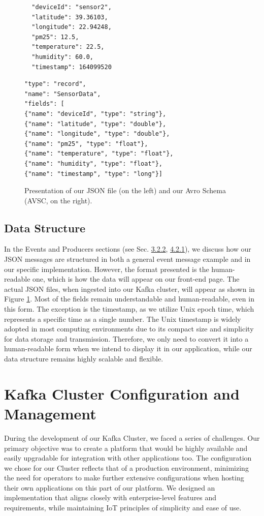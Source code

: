 \begin{figure}[htbp]
\begin{minipage}[t]{0.4\textwidth}
\begin{lstlisting}
  "deviceId": "sensor2",
  "latitude": 39.36103,
  "longitude": 22.94248,
  "pm25": 12.5,
  "temperature": 22.5,
  "humidity": 60.0,
  "timestamp": 164099520
\end{lstlisting}
\end{minipage}%
\hfill
\begin{minipage}[t]{0.55\textwidth}
\begin{lstlisting}
"type": "record",
"name": "SensorData",
"fields": [
{"name": "deviceId", "type": "string"},
{"name": "latitude", "type": "double"},
{"name": "longitude", "type": "double"},
{"name": "pm25", "type": "float"},
{"name": "temperature", "type": "float"},
{"name": "humidity", "type": "float"},
{"name": "timestamp", "type": "long"}]
\end{lstlisting}
\end{minipage}
\centering
\caption{Presentation of our JSON file (on the left) and our Avro Schema (AVSC, on the right).}
\label{json_avro}
\end{figure}

\subsection{Data Structure}
\label{data_structure}
In the Events and Producers sections (see Sec. \hyperref[events]{3.2.2}, \hyperref[producers]{4.2.1}), we discuss how our JSON messages are structured in both a general event message example and in our specific implementation. However, the format presented is the human-readable one, which is how the data will appear on our front-end page. The actual JSON files, when ingested into our Kafka cluster, will appear as shown in Figure \ref{json_avro}. Most of the fields remain understandable and human-readable, even in this form. The exception is the timestamp, as we utilize Unix epoch time, which represents a specific time as a single number. The Unix timestamp is widely adopted in most computing environments due to its compact size and simplicity for data storage and transmission. Therefore, we only need to convert it into a human-readable form when we intend to display it in our application, while our data structure remains highly scalable and flexible.


\section{Kafka Cluster Configuration and Management}
During the development of our Kafka Cluster, we faced a series of challenges. Our primary objective was to create a platform that would be highly available and easily upgradable for integration with other applications too. The configuration we chose for our Cluster reflects that of a production environment, minimizing the need for operators to make further extensive configurations when hosting their own applications on this part of our platform.
We designed an implementation that aligns closely with enterprise-level features and requirements, while maintaining IoT principles of simplicity and ease of use. 


